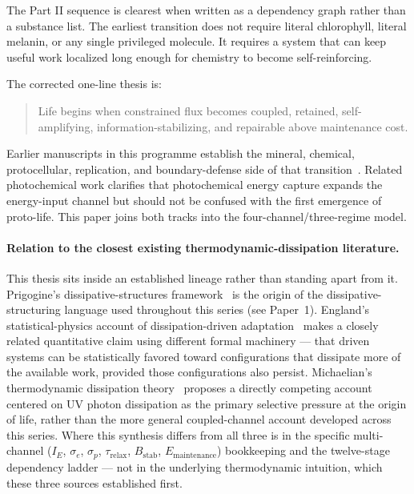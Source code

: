 \documentclass[11pt,a4paper]{article}
\begin{document}
The Part II sequence is clearest when written as a dependency graph rather than a substance list. The earliest transition does not require literal chlorophyll, literal melanin, or any single privileged molecule. It requires a system that can keep useful work localized long enough for chemistry to become self-reinforcing.

The corrected one-line thesis is:
\begin{quote}\small
Life begins when constrained flux becomes coupled, retained, self-amplifying,
information-stabilizing, and repairable above maintenance cost.
\end{quote}

Earlier manuscripts in this programme establish the mineral, chemical, protocellular, replication, and boundary-defense side of that transition~\cite{Russell1994,Martin2007,Lane2010,Szostak2010}. Related photochemical work clarifies that photochemical energy capture expands the energy-input channel but should not be confused with the first emergence of proto-life. This paper joins both tracks into the four-channel/three-regime model.

\paragraph{Relation to the closest existing thermodynamic-dissipation literature.}
This thesis sits inside an established lineage rather than standing apart from it. Prigogine's dissipative-structures framework~\cite{PrigogineNicolis1977} is the origin of the dissipative-structuring language used throughout this series (see Paper~1). England's statistical-physics account of dissipation-driven adaptation~\cite{England2013} makes a closely related quantitative claim using different formal machinery --- that driven systems can be statistically favored toward configurations that dissipate more of the available work, provided those configurations also persist. Michaelian's thermodynamic dissipation theory~\cite{Michaelian2011,Michaelian2017} proposes a directly competing account centered on UV photon dissipation as the primary selective pressure at the origin of life, rather than the more general coupled-channel account developed across this series. Where this synthesis differs from all three is in the specific multi-channel ($I_E$, $\sigma_e$, $\sigma_p$, $\tau_{\mathrm{relax}}$, $B_{\mathrm{stab}}$, $E_{\mathrm{maintenance}}$) bookkeeping and the twelve-stage dependency ladder --- not in the underlying thermodynamic intuition, which these three sources established first.
\end{document}
